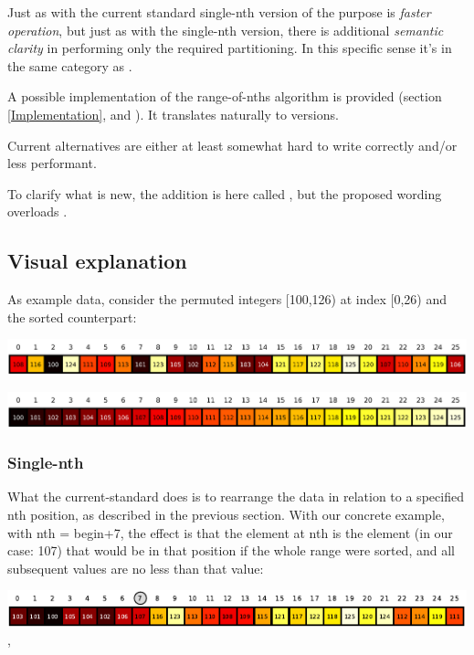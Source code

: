 Just as with the current standard single-nth version of  the purpose is \emph{faster operation}, but just as with the single-nth version, there is additional \emph{semantic clarity} in performing only the required partitioning. 
In this specific sense it's in the same category as .

A possible implementation of the range-of-nths algorithm is provided (section \ref{Implementation}, and \cite{p2375RefImpl}).
It translates naturally to  versions.

Current alternatives are either at least somewhat hard to write correctly and/or less performant.

To clarify what is new, the addition is here called , but the proposed wording overloads . 

\newpage
\subsection{Visual explanation}

As example data, consider the permuted integers [100,126) at index [0,26) and the sorted counterpart:

\includegraphics[width=0.999\textwidth]{plotting/figs/rnd.png}

\includegraphics[width=0.999\textwidth]{plotting/figs/sort.png}

\subsubsection*{Single-nth }

What the current-standard  does is to rearrange the data in relation to a specified nth position, as described in the previous section. With our concrete example, with {nth = begin+7}, the effect is that the element at nth is the element (in our case: 107) that  would  be  in  that position if the whole range were sorted, and all subsequent values are no less than that value:

\includegraphics[width=0.999\textwidth]{plotting/figs/1a.pdf},

